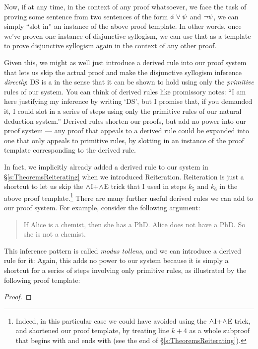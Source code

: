 \noindent Now, if at any time, in the context of any proof whatsoever, we face the task of proving some sentence \meta{\phi} from two sentences of the form $\mathcal{\phi} \vee \mathcal{\psi}$ and $\neg \mathcal{\psi}$, we can simply ``slot in'' an instance of the above proof template.  In other words, once we've proven one instance of disjunctive syllogism, we can use that as a template to prove disjunctive syllogism again in the context of any other proof.

Given this, we might as well just introduce a derived rule into our proof system that lets us skip the actual proof and make the disjunctive syllogism inference \emph{directly}:
DS is a  in the sense that it can be shown to hold using only the \emph{primitive} rules of our system.    You can think of derived rules like promissory notes: ``I am here justifying my inference by writing `DS', but I promise that, if you demanded it, I could slot in a series of steps using only the primitive rules of our natural deduction system.''  Derived rules shorten our proofs, but add no power into our proof system --- any proof that appeals to a derived rule could be expanded into one that only appeals to primitive rules, by slotting in an instance of the proof template corresponding to the derived rule.

In fact, we implicitly already added a derived rule to our system in \S\ref{s:TheoremsReiterating} when we introduced Reiteration.  Reiteration is just a shortcut to let us skip the $\wedge$I+$\wedge$E trick that I used in steps $k_5$ and $k_6$ in the above proof template.\footnote{Indeed, in this particular case we could have avoided using the $\wedge$I+$\wedge$E trick, and shortened our proof template, by treating line $k+4$ as a whole subproof that begins with \meta{\psi} and ends with \meta{\psi} (see the end of \S\ref{s:TheoremsReiterating}).}  There are many further useful derived rules we can add to our proof system.  For example, consider the following argument:
	\begin{quote}
		If Alice is a chemist, then she has a PhD. Alice does not have a PhD. So she is not a chemist.
	\end{quote}
This inference pattern is called \emph{modus tollens}, and we can introduce a derived rule for it:
Again, this adds no power to our system because it is simply a shortcut for a series of steps involving only primitive rules, as illustrated by the following proof template:
\begin{proof}
		\open
		\close
\end{proof}

